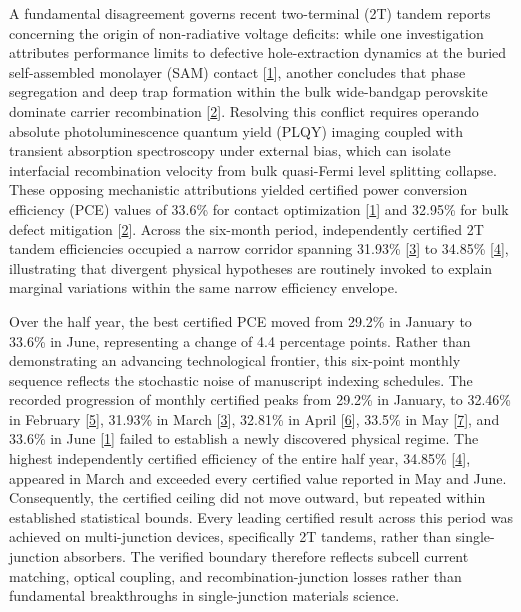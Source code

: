 \documentclass[
  11pt,
]{article}
\begin{document}
A fundamental disagreement governs recent two-terminal (2T) tandem
reports concerning the origin of non-radiative voltage deficits: while
one investigation attributes performance limits to defective
hole-extraction dynamics at the buried self-assembled monolayer (SAM)
contact {[}\href{https://doi.org/10.1126/science.aef5355}{1}{]}, another
concludes that phase segregation and deep trap formation within the bulk
wide-bandgap perovskite dominate carrier recombination
{[}\href{https://doi.org/10.1038/s41467-026-73276-w}{2}{]}. Resolving
this conflict requires operando absolute photoluminescence quantum yield
(PLQY) imaging coupled with transient absorption spectroscopy under
external bias, which can isolate interfacial recombination velocity from
bulk quasi-Fermi level splitting collapse. These opposing mechanistic
attributions yielded certified power conversion efficiency (PCE) values
of 33.6\% for contact optimization
{[}\href{https://doi.org/10.1126/science.aef5355}{1}{]} and 32.95\% for
bulk defect mitigation
{[}\href{https://doi.org/10.1038/s41467-026-73276-w}{2}{]}. Across the
six-month period, independently certified 2T tandem efficiencies
occupied a narrow corridor spanning 31.93\%
{[}\href{https://doi.org/10.1016/j.esci.2026.100563}{3}{]} to 34.85\%
{[}\href{https://doi.org/10.1002/adom.202503341}{4}{]}, illustrating
that divergent physical hypotheses are routinely invoked to explain
marginal variations within the same narrow efficiency envelope.

Over the half year, the best certified PCE moved from 29.2\% in January
to 33.6\% in June, representing a change of 4.4 percentage points.
Rather than demonstrating an advancing technological frontier, this
six-point monthly sequence reflects the stochastic noise of manuscript
indexing schedules. The recorded progression of monthly certified peaks
from 29.2\% in January, to 32.46\% in February
{[}\href{https://doi.org/10.1021/acsenergylett.5c04127}{5}{]}, 31.93\%
in March {[}\href{https://doi.org/10.1016/j.esci.2026.100563}{3}{]},
32.81\% in April {[}\href{https://doi.org/10.1002/adma.73106}{6}{]},
33.5\% in May
{[}\href{https://doi.org/10.1038/s41467-026-72794-x}{7}{]}, and 33.6\%
in June {[}\href{https://doi.org/10.1126/science.aef5355}{1}{]} failed
to establish a newly discovered physical regime. The highest
independently certified efficiency of the entire half year, 34.85\%
{[}\href{https://doi.org/10.1002/adom.202503341}{4}{]}, appeared in
March and exceeded every certified value reported in May and June.
Consequently, the certified ceiling did not move outward, but repeated
within established statistical bounds. Every leading certified result
across this period was achieved on multi-junction devices, specifically
2T tandems, rather than single-junction absorbers. The verified boundary
therefore reflects subcell current matching, optical coupling, and
recombination-junction losses rather than fundamental breakthroughs in
single-junction materials science.
\end{document}
